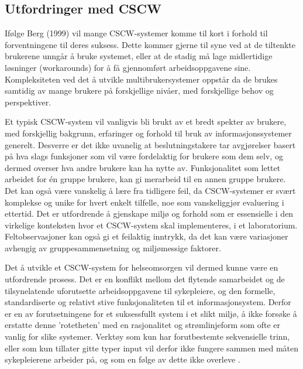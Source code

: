 \subsection{Utfordringer med CSCW}
\label{chp:utfordringerMedCSCW}

Ifølge Berg (1999) vil mange CSCW-systemer komme til kort i forhold til forventningene til deres suksess. Dette kommer gjerne til syne ved at de tiltenkte brukerene unngår å bruke systemet, eller at de stadig må lage midlertidige løsninger (workarounds) for å få gjennomført arbeidsoppgavene sine. 
Kompleksiteten ved det å utvikle multibrukersystemer oppstår da de brukes samtidig av mange brukere på forskjellige nivåer, med forskjellige behov og perspektiver.

\noindent 
Et typisk CSCW-system vil vanligvis bli brukt av et bredt spekter av brukere, med forskjellig bakgrunn, erfaringer og forhold til bruk av informasjonssystemer generelt. Desverre er det ikke uvanelig at beslutningstakere tar avgjørelser basert på hva slags funksjoner som vil være fordelaktig for brukere som dem selv, og dermed overser hva andre brukere kan ha nytte av. Funksjonalitet som lettet arbeidet for én gruppe brukere, kan gi merarbeid til en annen gruppe brukere. Det kan også være vanskelig å lære fra tidligere feil, da CSCW-systemer er svært komplekse og unike for hvert enkelt tilfelle, noe som vanskeliggjør evaluering i ettertid. Det er utfordrende å gjenskape miljø og forhold som er essensielle i den virkelige konteksten hvor et CSCW-system skal implementeres, i et laboratorium. Feltobservasjoner kan også gi et feilaktig inntrykk, da det kan være variasjoner avhengig av gruppesammensetning og miljømessige faktorer.

\noindent
Det å utvikle et CSCW-system for helseomsorgen vil dermed kunne være en utfordrende prosess. Det er en konflikt mellom det flytende samarbeidet og de tilsynelatende uforutsette arbeidsoppgavene til sykepleiere, og den formelle, standardiserte og relativt stive funksjonaliteten til et informasjonsystem. Derfor er en av forutsetningene for et suksessfullt system i et slikt miljø, å ikke forsøke å erstatte denne 'rotetheten' med en rasjonalitet og strømlinjeform som ofte er vanlig for slike systemer. Verktøy som kun har forutbestemte sekvensielle trinn, eller som kun tillater gitte typer input vil derfor ikke fungere sammen med måten sykepleierene arbeider på, og som en følge av dette ikke overleve \cite{Berg99}.